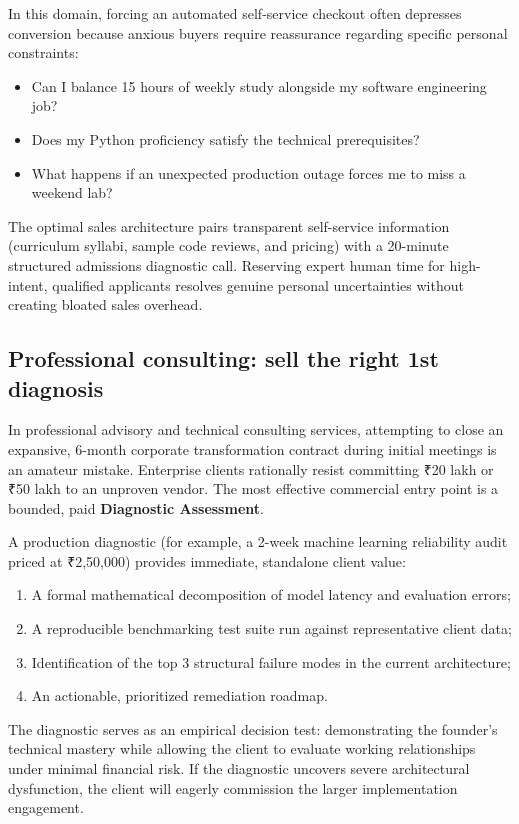 In this domain, forcing an automated self-service checkout often depresses conversion because anxious buyers require reassurance regarding specific personal constraints:
\begin{itemize}
\item Can I balance 15 hours of weekly study alongside my software engineering job?
\item Does my Python proficiency satisfy the technical prerequisites?
\item What happens if an unexpected production outage forces me to miss a weekend lab?
\end{itemize}
The optimal sales architecture pairs transparent self-service information (curriculum syllabi, sample code reviews, and pricing) with a 20-minute structured admissions diagnostic call. Reserving expert human time for high-intent, qualified applicants resolves genuine personal uncertainties without creating bloated sales overhead.

\subsection{Professional consulting: sell the right 1st diagnosis}

In professional advisory and technical consulting services, attempting to close an expansive, 6-month corporate transformation contract during initial meetings is an amateur mistake. Enterprise clients rationally resist committing ₹20 lakh or ₹50 lakh to an unproven vendor. The most effective commercial entry point is a bounded, paid \textbf{Diagnostic Assessment}.

A production diagnostic (for example, a 2-week machine learning reliability audit priced at ₹2,50,000) provides immediate, standalone client value:
\begin{enumerate}
\item A formal mathematical decomposition of model latency and evaluation errors;
\item A reproducible benchmarking test suite run against representative client data;
\item Identification of the top 3 structural failure modes in the current architecture;
\item An actionable, prioritized remediation roadmap.
\end{enumerate}
The diagnostic serves as an empirical decision test: demonstrating the founder's technical mastery while allowing the client to evaluate working relationships under minimal financial risk. If the diagnostic uncovers severe architectural dysfunction, the client will eagerly commission the larger implementation engagement.

